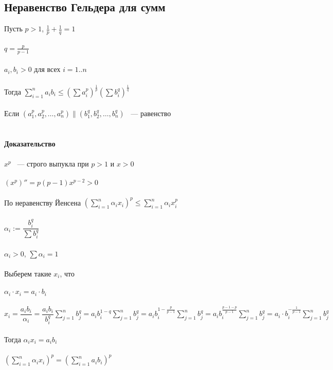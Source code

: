 \documentclass[../main.tex]{subfiles}
\begin{document}
\subsection{Неравенство Гельдера для сумм}

Пусть $p > 1$, $\frac{1}{p} + \frac{1}{q} = 1$\\\\
$q = \frac{p}{p - 1}$\\\\
$a_i, b_i > 0$ для всех $i = 1..n$\\\\
Тогда $\sum\limits^n_{i = 1} a_i b_i \leq (\sum a_i^p)^{\frac{1}{p}} (\sum b_i^q)^{\frac{1}{q}}$\\\\
Если $(a_1^p, a_2^p, \ldots, a_n^p) \parallel (b_1^q, b_2^q, \ldots, b_n^q)$ ~--- равенство\\\\\\
\textbf{Доказательство}\\\\
$x^p$ ~--- строго выпукла при $p > 1$ и $x > 0$\\\\
$(x^p)'' = p(p - 1)x^{p - 2} > 0$\\\\
По неравенству Йенсена $\left(\sum\limits_{i = 1}^n \alpha_i x_i \right)^p \leq \sum\limits_{i = 1}^n \alpha_i x_i^p$\\\\
$\alpha_i := \dfrac{b_i^q}{\sum b_i^q}$\\\\
$\alpha_i > 0$, $\sum \alpha_i = 1$\\\\
Выберем такие $x_i$, что\\\\
$\alpha_i \cdot x_i = a_i \cdot b_i$\\\\
$x_i = \dfrac{a_i b_i}{\alpha_i} = \dfrac{a_i b_i}{b_i^q} \sum\limits_{j = 1}^n b_j^q = a_i b_i^{1 - q} \sum\limits_{j = 1}^n b_j^q = a_i b_i^{1 - \frac{p}{p - 1}} \sum\limits_{j = 1}^n b_j^q = a_i b_i^{\frac{p - 1 - p}{p - 1}} \sum\limits_{j = 1}^n b_j^q = a_i \cdot b_i^{-\frac{1}{p - 1}} \sum\limits_{j = 1}^n b_j^q$\\\\
Тогда $\alpha_i x_i = a_i b_i$\\\\
$(\sum\limits_{i = 1}^n \alpha_i x_i)^p = (\sum\limits_{i = 1}^n a_i b_i)^p$\\\\
\end{document}
